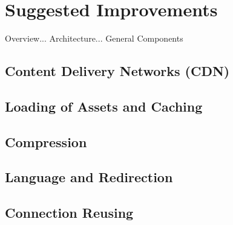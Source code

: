 \chapter{Suggested Improvements}
\label{chap:implementation}

Overview... Architecture... General Components

\section{Content Delivery Networks (CDN)}

\section{Loading of Assets and Caching}

\section{Compression}

\section{Language and Redirection}

\section{Connection Reusing}
